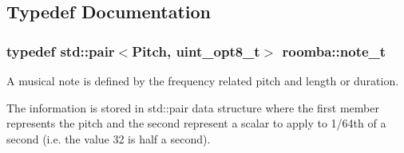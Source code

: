 \subsection{Typedef Documentation}
\hypertarget{namespaceroomba_a19e8ac8a2208a1a44fa9273930cf7451}{
\subsubsection[{note\+\_\+t}]{\setlength{\rightskip}{0pt plus 5cm}typedef std\+::pair$<${\bf Pitch}, uint\+\_\+opt8\+\_\+t$>$ {\bf roomba\+::note\+\_\+t}}}\label{namespaceroomba_a19e8ac8a2208a1a44fa9273930cf7451}


A musical note is defined by the frequency related pitch and length or duration. 

The information is stored in std\+::pair data structure where the first member represents the pitch and the second represent a scalar to apply to 1/64th of a second (i.\+e. the value 32 is half a second). 
